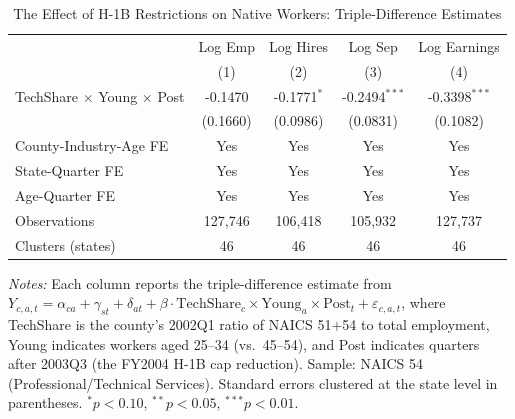 \begin{table}[htbp]
\centering
\caption{The Effect of H-1B Restrictions on Native Workers: Triple-Difference Estimates}
\label{tab:main_ddd}
\begin{tabular}{lcccc}
\toprule
 & Log Emp & Log Hires & Log Sep & Log Earnings \\
 & (1) & (2) & (3) & (4) \\
\midrule
TechShare $\times$ Young $\times$ Post & -0.1470 & -0.1771$^{*}$ & -0.2494$^{***}$ & -0.3398$^{***}$ \\
 & (0.1660) & (0.0986) & (0.0831) & (0.1082) \\
[0.5em]
County-Industry-Age FE & Yes & Yes & Yes & Yes \\
State-Quarter FE & Yes & Yes & Yes & Yes \\
Age-Quarter FE & Yes & Yes & Yes & Yes \\
Observations & 127,746 & 106,418 & 105,932 & 127,737 \\
Clusters (states) & 46 & 46 & 46 & 46 \\
\bottomrule
\end{tabular}
\begin{tablenotes}[flushleft]
\small
\item \textit{Notes:} Each column reports the triple-difference estimate from $Y_{c,a,t} = \alpha_{ca} + \gamma_{st} + \delta_{at} + \beta \cdot \text{TechShare}_c \times \text{Young}_a \times \text{Post}_t + \varepsilon_{c,a,t}$, where TechShare is the county's 2002Q1 ratio of NAICS 51+54 to total employment, Young indicates workers aged 25--34 (vs.\ 45--54), and Post indicates quarters after 2003Q3 (the FY2004 H-1B cap reduction). Sample: NAICS 54 (Professional/Technical Services). Standard errors clustered at the state level in parentheses. $^{*}p<0.10$, $^{**}p<0.05$, $^{***}p<0.01$.
\end{tablenotes}
\end{table}

